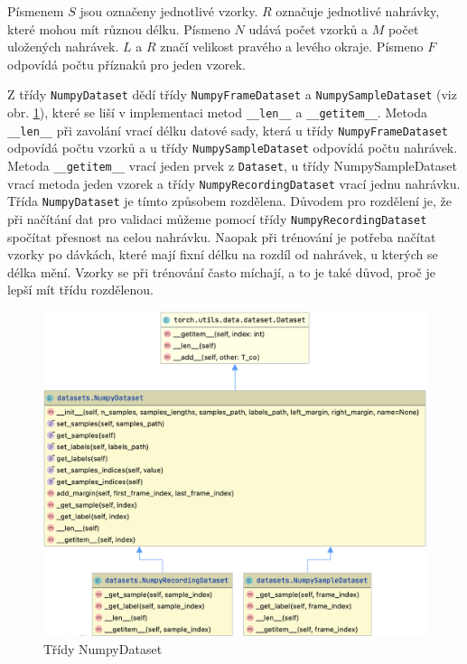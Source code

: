\documentclass[FM,BP]{tulthesis}
\begin{document}
Písmenem $ S $ jsou označeny jednotlivé vzorky. $ R $ označuje jednotlivé nahrávky, které mohou mít různou délku. Písmeno $ N $ udává počet vzorků a $ M $ počet uložených nahrávek. $ L $ a $ R $ značí velikost pravého a levého okraje. Písmeno $ F $ odpovídá počtu příznaků pro jeden vzorek.

Z třídy \texttt{\mbox{NumpyDataset}} dědí třídy \texttt{\mbox{NumpyFrameDataset}} a \texttt{\mbox{NumpySampleDataset}} (viz obr. \mbox{\ref{fig:numpy_dataset}}), které se liší v implementaci metod \texttt{\_\_len\_\_} a \texttt{\_\_getitem\_\_}. Metoda \texttt{\_\_len\_\_} při zavolání vrací délku datové sady, která u třídy \texttt{\mbox{NumpyFrameDataset}} odpovídá počtu vzorků a u třídy \texttt{\mbox{NumpySampleDataset}} odpovídá počtu nahrávek. Metoda \texttt{\_\_getitem\_\_} vrací jeden prvek z \texttt{\mbox{Dataset}}, u třídy \mbox{NumpySampleDataset} vrací metoda jeden vzorek a třídy \texttt{\mbox{NumpyRecordingDataset}} vrací jednu nahrávku. Třída \texttt{\mbox{NumpyDataset}} je tímto způsobem rozdělena. Důvodem pro rozdělení je, že při načítání dat pro validaci můžeme pomocí třídy \texttt{\mbox{NumpyRecordingDataset}} spočítat přesnost na celou nahrávku. Naopak při trénování je potřeba načítat vzorky po dávkách, které mají fixní délku na rozdíl od nahrávek, u kterých se délka mění. Vzorky se při trénování často míchají, a to je také důvod, proč je lepší mít třídu rozdělenou.

\begin{figure}[ht]
\centerline{\includegraphics[scale=.185]{datasets.png}}
\caption{Třídy NumpyDataset}
\label{fig:numpy_dataset}
\end{figure}
\FloatBarrier
\end{document}
